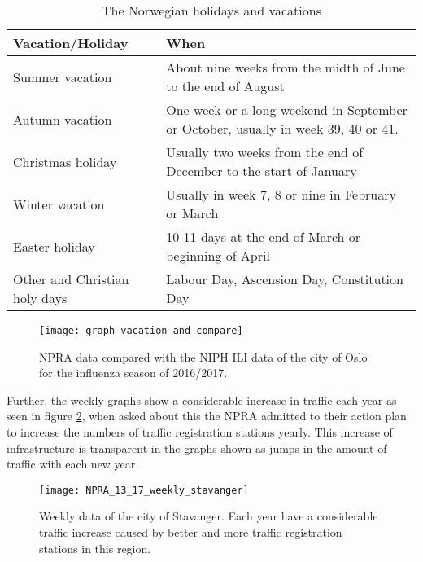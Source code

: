 \begin{center}
\begin{table}[!h]
\begin{tabular}{ | m{9em} | m{10.4cm}| }
 \hline
 \textbf{Vacation/Holiday} & \textbf{When} \\ [0.5ex] 
 \hline
 Summer vacation & About nine weeks from the midth of June to the end of August  \\ 
 \hline 
 Autumn vacation & One week or a long weekend in September or October, usually in week 39, 40 or 41.\\ 
 \hline
 Christmas holiday & Usually two weeks from the end of December to the start of January\\ 
 \hline
 Winter vacation & Usually in week 7, 8 or nine in February or March \\ 
  \hline
 Easter holiday & 10-11 days at the end of March or beginning of April \\ 
  \hline
 Other and Christian holy days & Labour Day, Ascension Day, Constitution Day \\ 
  \hline
\end{tabular}
\caption{The Norwegian holidays and vacations}
 \label{table:jesus}
\end{table}
\end{center}

\begin{figure}[!htb]
\texttt{[image: graph\_vacation\_and\_compare]}
\centering
\caption{NPRA data compared with the NIPH ILI data of the city of Oslo for the influenza season of 2016/2017.}
\label{fig:graph_vacation_and_compare}
\end{figure}

Further, the weekly graphs show a considerable increase in traffic each year as seen in figure \ref{fig:weeklystavanger}, when asked about this the NPRA admitted to their action plan to increase the numbers of traffic registration stations yearly. This increase of infrastructure is transparent in the graphs shown as jumps in the amount of traffic with each new year. 

\begin{figure}[!htb]
\texttt{[image: NPRA\_13\_17\_weekly\_stavanger]}
\centering
\caption{Weekly data of the city of Stavanger. Each year have a considerable traffic increase caused by better and more traffic registration stations in this region.}
\label{fig:weeklystavanger}
\end{figure}








